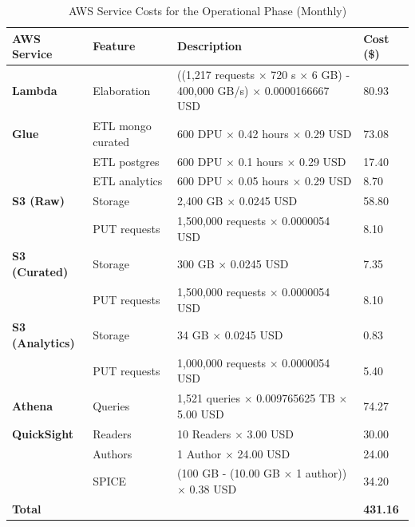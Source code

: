 \begin{table}[h]
    \centering
    \begin{tabular}{|p{2.75cm}|p{2.5cm}|p{6.5cm}|p{1.75cm}|}
        \hline
        \textbf{AWS Service} & \textbf{Feature} & \textbf{Description} & \textbf{Cost (\$)} \\ \hline
        \textbf{Lambda} & Elaboration & ((1,217 requests $\times$ 720 s $\times$ 6 GB) - 400,000 GB/s) $\times$ 0.0000166667 USD & 80.93 \\ \hline
        \textbf{Glue} & ETL mongo curated & 600 DPU $\times$ 0.42 hours $\times$ 0.29 USD & 73.08 \\ \hline
        & ETL postgres & 600 DPU $\times$ 0.1 hours $\times$ 0.29 USD & 17.40 \\ \hline
        & ETL analytics & 600 DPU $\times$ 0.05 hours $\times$ 0.29 USD & 8.70 \\ \hline
        \textbf{S3 (Raw)} & Storage & 2,400 GB $\times$ 0.0245 USD & 58.80 \\ \hline
        & PUT requests & 1,500,000 requests $\times$ 0.0000054 USD & 8.10 \\ \hline
        \textbf{S3 (Curated)} & Storage & 300 GB $\times$ 0.0245 USD & 7.35 \\ \hline
        & PUT requests & 1,500,000 requests $\times$ 0.0000054 USD & 8.10 \\ \hline
        \textbf{S3 (Analytics)} & Storage & 34 GB $\times$ 0.0245 USD & 0.83 \\ \hline
        & PUT requests & 1,000,000 requests $\times$ 0.0000054 USD & 5.40 \\ \hline
        \textbf{Athena} & Queries & 1,521 queries $\times$ 0.009765625 TB $\times$ 5.00 USD & 74.27 \\ \hline
        \textbf{QuickSight} & Readers & 10 Readers $\times$ 3.00 USD & 30.00 \\ \hline
        & Authors & 1 Author $\times$ 24.00 USD & 24.00 \\ \hline
        & SPICE & (100 GB - (10.00 GB $\times$ 1 author)) $\times$ 0.38 USD & 34.20 \\ \hline
        \multicolumn{3}{|l|}{\textbf{Total}} & \textbf{431.16} \\ \hline
    \end{tabular}
    \caption{AWS Service Costs for the Operational Phase (Monthly)}
    \label{tab:operational_costs}
\end{table}

